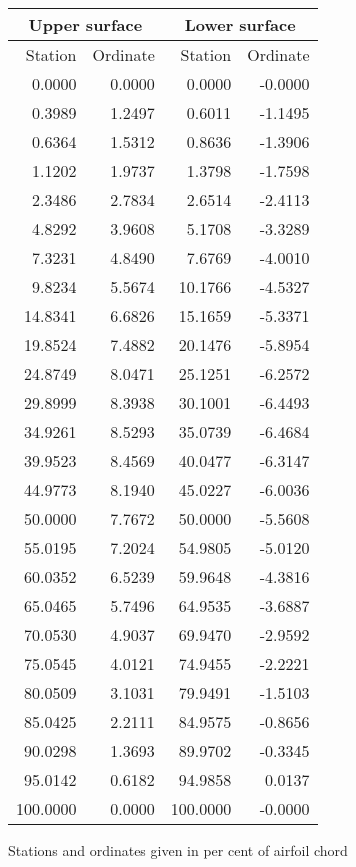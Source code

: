 \documentclass[11pt]{book}
\begin{document}
 \hspace{4mm}
 \begin{tabular}{|r|r|r|r|} \hline 
 \multicolumn{2}{|c|}{Upper surface} & \multicolumn{2}{|c|}{Lower surface} \\
 \hline
 Station & Ordinate & Station & Ordinate \\
 \hline
0.0000 & 0.0000 & 0.0000 & -0.0000 \\
0.3989 & 1.2497 & 0.6011 & -1.1495 \\
0.6364 & 1.5312 & 0.8636 & -1.3906 \\
1.1202 & 1.9737 & 1.3798 & -1.7598 \\
2.3486 & 2.7834 & 2.6514 & -2.4113 \\
4.8292 & 3.9608 & 5.1708 & -3.3289 \\
7.3231 & 4.8490 & 7.6769 & -4.0010 \\
9.8234 & 5.5674 & 10.1766 & -4.5327 \\
14.8341 & 6.6826 & 15.1659 & -5.3371 \\
19.8524 & 7.4882 & 20.1476 & -5.8954 \\
24.8749 & 8.0471 & 25.1251 & -6.2572 \\
29.8999 & 8.3938 & 30.1001 & -6.4493 \\
34.9261 & 8.5293 & 35.0739 & -6.4684 \\
39.9523 & 8.4569 & 40.0477 & -6.3147 \\
44.9773 & 8.1940 & 45.0227 & -6.0036 \\
50.0000 & 7.7672 & 50.0000 & -5.5608 \\
55.0195 & 7.2024 & 54.9805 & -5.0120 \\
60.0352 & 6.5239 & 59.9648 & -4.3816 \\
65.0465 & 5.7496 & 64.9535 & -3.6887 \\
70.0530 & 4.9037 & 69.9470 & -2.9592 \\
75.0545 & 4.0121 & 74.9455 & -2.2221 \\
80.0509 & 3.1031 & 79.9491 & -1.5103 \\
85.0425 & 2.2111 & 84.9575 & -0.8656 \\
90.0298 & 1.3693 & 89.9702 & -0.3345 \\
95.0142 & 0.6182 & 94.9858 & 0.0137 \\
100.0000 & 0.0000 & 100.0000 & -0.0000 \\
 \hline 
 \end{tabular}
 \vspace{8mm}

Stations and ordinates given in per cent of airfoil chord
\end{document}
